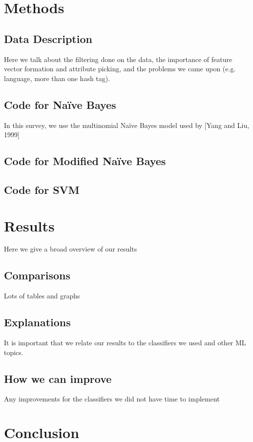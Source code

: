 \documentclass[11pt,letterpaper]{article}
\begin{document}
\section{Methods}
\subsection{Data Description}
Here we talk about the filtering done on the data, the importance of feature vector formation and attribute picking, and the problems we came upon (e.g. language, more than one hash tag).

\subsection{Code for Na{\"i}ve Bayes}
  In this survey, we use the multinomial Na{\"i}ve Bayes model used by [Yang and Liu, 1999]

\subsection{Code for Modified Na{\"i}ve Bayes}

\subsection{Code for SVM}

\section{Results}
Here we give a broad overview of our results

\subsection{Comparisons}
Lots of tables and graphs

\subsection{Explanations}
It is important that we relate our results  to the classifiers we used and other ML topics.

\subsection{How we can improve}
Any improvements for the classifiers we did not have time to implement

\section{Conclusion}
\end{document}
